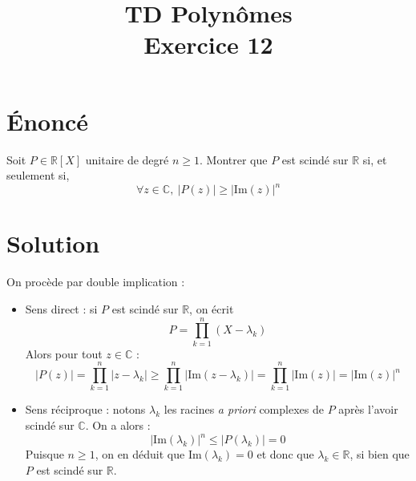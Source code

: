\documentclass[french]{article}
\title{TD Polynômes \\ Exercice 12}
\date{}
\newcommand{\R}{\mathbb{R}}
\newcommand{\C}{\mathbb{C}}
\newcommand{\im}{\text{Im}}
\begin{document}
\maketitle

\section{Énoncé}
Soit $P\in\R[X]$ unitaire de degré $n\geqslant1$. Montrer que $P$ est scindé sur $\R$ si, et seulement si, $$\forall z\in\C,\ \lvert P(z)\rvert\geqslant\lvert\im(z)\rvert^n$$
\section{Solution}
On procède par double implication :
\begin{itemize}
	\item Sens direct : si $P$ est scindé sur $\R$, on écrit $$P=\prod_{k=1}^{n}(X-\lambda_k)$$ Alors pour tout $z\in\C$ : $$\lvert P(z)\rvert=\prod_{k=1}^{n}\lvert z-\lambda_k\rvert \geqslant \prod_{k=1}^{n}\lvert\im(z-\lambda_k)\rvert=\prod_{k=1}^{n}\lvert\im(z)\rvert=\lvert\im(z)\rvert ^n$$
	\item Sens réciproque : notons $\lambda_k$ les racines \textit{a priori} complexes de $P$ après l'avoir scindé sur $\C$. On a alors : $$\lvert\im(\lambda_k)\rvert^n\leqslant\lvert P(\lambda_k)\rvert=0$$ Puisque $n\geqslant1$, on en déduit que $\im(\lambda_k)=0$ et donc que $\lambda_k\in\R$, si bien que $P$ est scindé sur $\R$.
\end{itemize}
\end{document}
